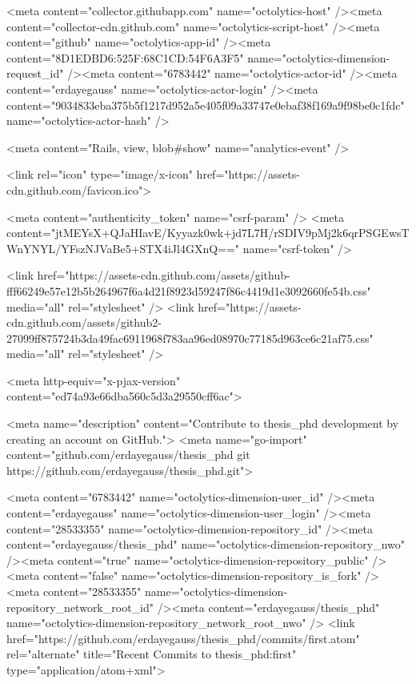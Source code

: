     <meta content="collector.githubapp.com" name="octolytics-host" /><meta content="collector-cdn.github.com" name="octolytics-script-host" /><meta content="github" name="octolytics-app-id" /><meta content="8D1EDBD6:525F:68C1CD:54F6A3F5" name="octolytics-dimension-request_id" /><meta content="6783442" name="octolytics-actor-id" /><meta content="erdayegauss" name="octolytics-actor-login" /><meta content="9034833eba375b5f1217d952a5e405f09a33747e0ebaf38f169a9f98be0c1fdc" name="octolytics-actor-hash" />
    
    <meta content="Rails, view, blob#show" name="analytics-event" />

    
    <link rel="icon" type="image/x-icon" href="https://assets-cdn.github.com/favicon.ico">


    <meta content="authenticity_token" name="csrf-param" />
<meta content="jtMEYsX+QJaHIavE/Kyyazk0wk+jd7L7H/rSDIV9pMj2k6qrPSGEwsTWnYNYL/YFszNJVaBe5+STX4iJl4GXnQ==" name="csrf-token" />

    <link href="https://assets-cdn.github.com/assets/github-fff66249e57e12b5b264967f6a4d21f8923d59247f86c4419d1e3092660fe54b.css" media="all" rel="stylesheet" />
    <link href="https://assets-cdn.github.com/assets/github2-27099ff875724b3da49fac6911968f783aa96ed08970c77185d963ce6c21af75.css" media="all" rel="stylesheet" />
    
    


    <meta http-equiv="x-pjax-version" content="ed74a93e66dba560c5d3a29550cff6ac">

      
  <meta name="description" content="Contribute to thesis_phd development by creating an account on GitHub.">
  <meta name="go-import" content="github.com/erdayegauss/thesis_phd git https://github.com/erdayegauss/thesis_phd.git">

  <meta content="6783442" name="octolytics-dimension-user_id" /><meta content="erdayegauss" name="octolytics-dimension-user_login" /><meta content="28533355" name="octolytics-dimension-repository_id" /><meta content="erdayegauss/thesis_phd" name="octolytics-dimension-repository_nwo" /><meta content="true" name="octolytics-dimension-repository_public" /><meta content="false" name="octolytics-dimension-repository_is_fork" /><meta content="28533355" name="octolytics-dimension-repository_network_root_id" /><meta content="erdayegauss/thesis_phd" name="octolytics-dimension-repository_network_root_nwo" />
  <link href="https://github.com/erdayegauss/thesis_phd/commits/first.atom" rel="alternate" title="Recent Commits to thesis_phd:first" type="application/atom+xml">

